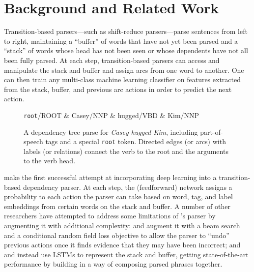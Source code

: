 \documentclass[11pt,a4paper]{article}
\begin{document}
\section{Background and Related Work}
Transition-based parsers---such as shift-reduce parsers---parse sentences from left to right, maintaining a ``buffer'' of words that have not yet been parsed and a ``stack'' of words whose head has not been seen or whose dependents have not all been fully parsed. At each step, transition-based parsers can access and manipulate the stack and buffer and assign arcs from one word to another. One can then train any multi-class machine learning classifier on features extracted from the stack, buffer, and previous arc actions in order to predict the next action.

\begin{figure}
\begin{center}
\begin{dependency}[theme=default]
  \begin{deptext}
    \texttt{root}/ROOT \& Casey/NNP \& hugged/VBD \& Kim/NNP \\
  \end{deptext}
\end{dependency}
\end{center}
\caption{A dependency tree parse for \emph{Casey hugged Kim}, including part-of-speech tags and a special \texttt{root} token. Directed edges (or arcs) with labels (or relations) connect the verb to the root and the arguments to the verb head.}
\label{dep}
\end{figure}
 
\citet{ChenManning2014} make the first successful attempt at incorporating deep learning into a transition-based dependency parser. At each step, the (feedforward) network assigns a probability to each action the parser can take based on word, tag, and label embeddings from certain words on the stack and buffer. A number of other researchers have attempted to address some limitations of \citeauthor{ChenManning2014}'s \citeauthor{ChenManning2014} parser by augmenting it with additional complexity: \citet{Weissetal2015} and \citet{Andoretal2016} augment it with a beam search and a conditional random field loss objective to allow the parser to ``undo'' previous actions once it finds evidence that they may have been incorrect; and \citet{Dyeretal2015} and \citep{KuncoroBallesterosetal2016} instead use LSTMs to represent the stack and buffer, getting state-of-the-art performance by building in a way of composing parsed phrases together.
\end{document}
